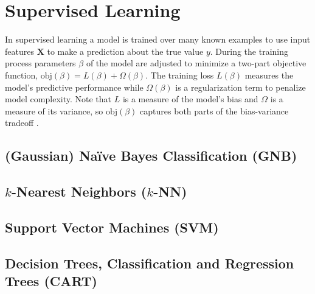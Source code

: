 \section{Supervised Learning}
\label{ml:supervised}

In supervised learning a model is trained over many known examples
to use input features $\mathbf{X}$ to make a prediction \yhat about the true value $y$.
During the training process parameters $\beta$ of
the model are adjusted to minimize a two-part objective function,
$\text{obj}\left(\beta\right) = L\left(\beta\right) + \Omega\left(\beta\right)$.
The training loss $L\left(\beta\right)$ measures the model's predictive performance
while $\Omega\left(\beta\right)$ is a regularization term to penalize model complexity.
Note that $L$ is a measure of the model's bias and $\Omega$ is a measure of its variance,
so $\text{obj}\left(\beta\right)$ captures both parts of the bias-variance tradeoff \cite{HastieTF09}.

\subsection{(Gaussian) N{a\"i}ve Bayes Classification (GNB)}
\label{ml:supervised:Bayes}

\subsection{\texorpdfstring{$k$}{k}-Nearest Neighbors (\texorpdfstring{$k$}{k}-NN)}
\label{ml:supervised:kNN}

\subsection{Support Vector Machines (SVM)}
\label{ml:supervised:SVM}

\subsection{Decision Trees, \texorpdfstring{\ie}{ie} Classification and Regression Trees (CART)}
\label{ml:supervised:CART}

